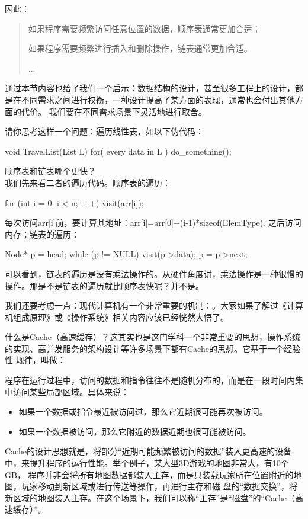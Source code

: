 因此：

\begin{quote}
如果程序需要频繁访问任意位置的数据，顺序表通常更加合适；

如果程序需要频繁进行插入和删除操作，链表通常更加合适。

...
\end{quote}

通过本节内容也给了我们一个启示：数据结构的设计，甚至很多工程上的设计，都是在不同需求之间进行权衡，一种设计提高了某方面的表现，通常也会付出其他方面的代价。
我们要在不同需求场景下灵活地进行取舍。

\begin{insightbox}
    请你思考这样一个问题：遍历线性表，如以下伪代码：
    \begin{cppcode}
        void TravelList(List L) {
            for( every data in L ) {
                do_something();
            }
        }
    \end{cppcode}
    顺序表和链表哪个更快？\\
    
    我们先来看二者的遍历代码。顺序表的遍历：
    \begin{cppcode}
        for (int i = 0; i < n; i++) {
            visit(arr[i]);
        }
    \end{cppcode}
    每次访问arr[i]前，要计算其地址：arr[i]=arr[0]+(i-1)*sizeof(ElemType). 之后访问内存；链表的遍历：
    \begin{cppcode}
        Node* p = head;
        while (p != NULL) {
            visit(p->data);
            p = p->next;
        }
    \end{cppcode}
    可以看到，链表的遍历是没有乘法操作的。从硬件角度讲，乘法操作是一种很慢的操作。那是不是链表的遍历就比顺序表快呢？并不是。

    我们还要考虑一点：现代计算机有一个非常重要的机制：。大家如果了解过《计算机组成原理》或《操作系统》相关内容应该已经恍然大悟了。

    什么是Cache（高速缓存）？这其实也是这门学科一个非常重要的思想，操作系统的实现、高并发服务的架构设计等许多场景下都有Cache的思想。它基于一个经验性
    规律，叫做：

    程序在运行过程中，访问的数据和指令往往不是随机分布的，而是在一段时间内集中访问某些局部区域。具体来说：
    \begin{itemize}
        \item 如果一个数据或指令最近被访问过，那么它近期很可能再次被访问。
        \item 如果一个数据被访问，那么它附近的数据近期也很可能被访问。
    \end{itemize}
    Cache的设计思想就是，将部分“近期可能频繁被访问的数据”装入更高速的设备中，来提升程序的运行性能。举个例子，某大型3D游戏的地图非常大，有10个GB，
    程序并非会将所有地图数据都装入主存，而是只装载玩家所在位置附近的地图，玩家移动到新区域或进行传送等操作，再进行主存和磁
    盘的“数据交换”，将新区域的地图装入主存。在这个场景下，我们可以称“主存”是“磁盘”的“Cache（高速缓存）”。\\


\end{insightbox}
